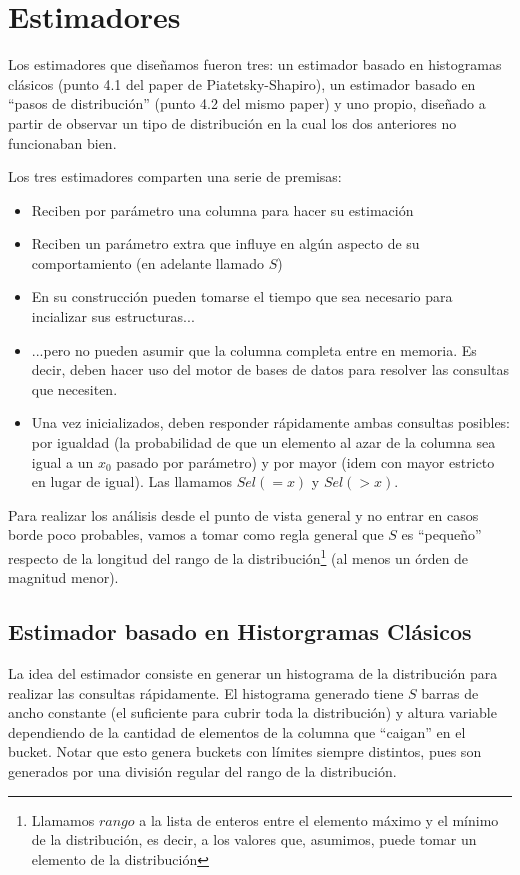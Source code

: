 \section{Estimadores}
Los estimadores que diseñamos fueron tres: un estimador basado en histogramas clásicos (punto 4.1 del paper de Piatetsky-Shapiro), un estimador basado en ``pasos de distribución'' (punto 4.2 del mismo paper) y uno propio, diseñado a partir de observar un tipo de distribución en la cual los dos anteriores no funcionaban bien.

Los tres estimadores comparten una serie de premisas:
\begin{itemize}
 \item Reciben por parámetro una columna para hacer su estimación
 \item Reciben un parámetro extra que influye en algún aspecto de su comportamiento (en adelante llamado $S$)
 \item En su construcción pueden tomarse el tiempo que sea necesario para incializar sus estructuras...
 \item ...pero no pueden asumir que la columna completa entre en memoria. Es decir, deben hacer uso del motor de bases de datos para resolver las consultas que necesiten. 
 \item Una vez inicializados, deben responder rápidamente ambas consultas posibles: por igualdad (la probabilidad de que un elemento al azar de la columna sea igual a un $x_0$ pasado por parámetro) y por mayor (idem con mayor estricto en lugar de igual). Las llamamos $Sel(=x)$ y $Sel(>x)$.
\end{itemize}

Para realizar los análisis desde el punto de vista general y no entrar en casos borde poco probables, vamos a tomar como regla general que $S$ es ``pequeño'' respecto de la longitud del rango de la distribución\footnote{Llamamos $rango$ a la lista de enteros entre el elemento máximo y el mínimo de la distribución, es decir, a los valores que, asumimos, puede tomar un elemento de la distribución} (al menos un órden de magnitud menor).


\subsection{Estimador basado en Historgramas Clásicos}
La idea del estimador consiste en generar un histograma de la distribución para realizar las consultas rápidamente. El histograma generado tiene $S$ barras de ancho constante (el suficiente para cubrir toda la distribución) y altura variable dependiendo de la cantidad de elementos de la columna que ``caigan'' en el bucket. Notar que esto genera buckets con límites siempre distintos, pues son generados por una división regular del rango de la distribución.

